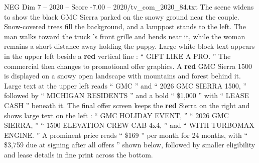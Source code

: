 \begin{textsample}{NEG Dim 7 – 2020 – Score -7.00 – 2020/tv\_com\_2020\_84.txt}
The scene widens to show the black GMC Sierra parked on the snowy ground near the couple.
Snow-covered trees fill the background, and a lamppost stands to the left.
The man walks toward the truck ’s front grille and bends near it, while the woman remains a short distance away holding the puppy.
Large white block text appears in the upper left beside a \textbf{red} vertical line : “ GIFT LIKE A PRO. ” The commercial then changes to promotional offer graphics.
A \textbf{red} GMC Sierra 1500 is displayed on a snowy open landscape with mountains and forest behind it.
Large text at the upper left reads “ GMC ” and “ 2026 GMC SIERRA 1500, ” followed by “ MICHIGAN RESIDENTS ” and a bold “ \$1,000 ” with “ LEASE CASH ” beneath it.
The final offer screen keeps the \textbf{red} Sierra on the right and shows large text on the left : “ GMC HOLIDAY EVENT, ” “ 2026 GMC SIERRA, ” “ 1500 ELEVATION CREW CAB 4x4, ” and “ WITH TURBOMAX ENGINE. ” A prominent price reads “ \$169 ” per month for 24 months, with “ \$3,759 due at signing after all offers ” shown below, followed by smaller eligibility and lease details in fine print across the bottom.

\end{textsample}
